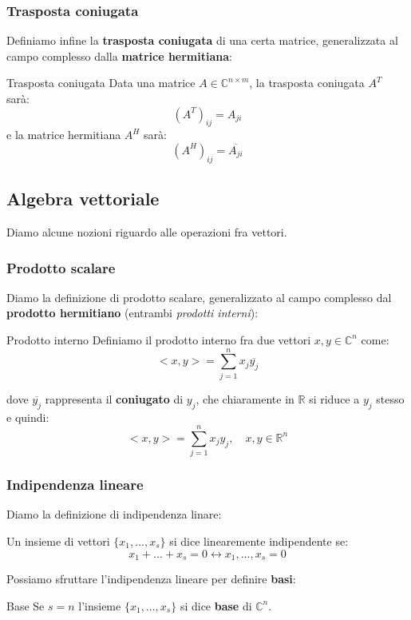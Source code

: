 \documentclass[a4paper,11pt]{article}
\begin{document}
\subsubsection{Trasposta coniugata}
Definiamo infine la \textbf{trasposta coniugata} di una certa matrice, generalizzata al campo complesso dalla \textbf{matrice hermitiana}:
\begin{definition}{Trasposta coniugata}
	Data una matrice $A \in \mathbb{C}^{n \times m}$, la trasposta coniugata $A^T$ sarà:
	$$
		(A^T)_{ij} = A_{ji}
	$$
	e la matrice hermitiana $A^H$ sarà: 
	$$
		(A^H)_{ij} = \overline{A_{ji}}
	$$
\end{definition}

\subsection{Algebra vettoriale}
Diamo alcune nozioni riguardo alle operazioni fra vettori.

\subsubsection{Prodotto scalare}
Diamo la definizione di prodotto scalare, generalizzato al campo complesso dal \textbf{prodotto hermitiano} (entrambi \textit{prodotti interni}):
\begin{definition}{Prodotto interno}
	Definiamo il prodotto interno fra due vettori $x, y \in \mathbb{C}^n$ come:
	$$
	<x, y> = \sum_{j = 1}^n x_j \overline{y_j}
	$$
\end{definition}
dove $\overline{y_j}$ rappresenta il \textbf{coniugato} di $y_j$, che chiaramente in $\mathbb{R}$ si riduce a $y_j$ stesso e quindi:
	$$
	<x, y> = \sum_{j = 1}^n x_j y_j, \quad x, y \in \mathbb{R}^n
	$$ 


\subsubsection{Indipendenza lineare}
Diamo la definizione di indipendenza linare:
\begin{definition}{}
	Un insieme di vettori $\{x_1, ..., x_s\}$ si dice linearemente indipendente se:
	$$
		x_1 + ... + x_s = 0 \leftrightarrow x_1, ..., x_s = 0
	$$
\end{definition}

Possiamo sfruttare l'indipendenza lineare per definire \textbf{basi}:
\begin{definition}{Base}
	Se $s = n$ l'insieme $\{ x_1, ...,x_s \}$ si dice \textbf{base} di $\mathbb{C}^n$.
\end{definition}
\end{document}
